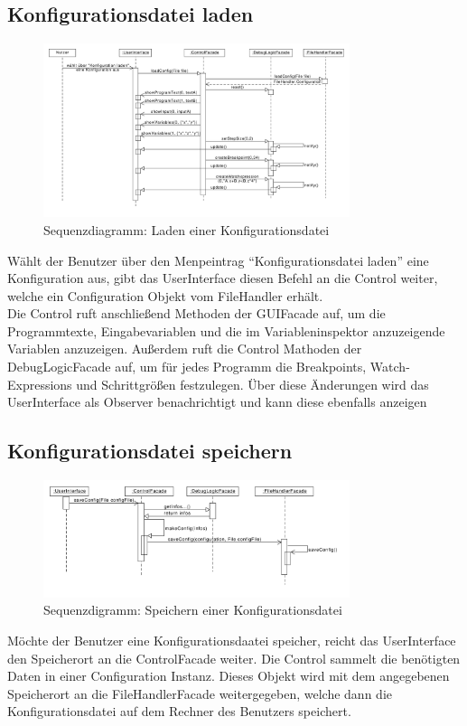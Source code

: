 \documentclass[parskip=full]{scrartcl}
\begin{document}
\subsection{Konfigurationsdatei laden}
\begin{figure}[!h]
\centering
\includegraphics[width=0.8\textwidth]{diagrammIdeenUmlet/SequenceDiagrams/seq_loadConfigPDF.pdf}
\caption{Sequenzdiagramm:  Laden einer Konfigurationsdatei}
\end{figure}
Wählt der Benutzer über den Menpeintrag \enquote{Konfigurationsdatei laden} eine Konfiguration aus,
gibt das UserInterface diesen Befehl an die Control weiter, welche ein Configuration Objekt vom FileHandler 
erhält. \\
Die Control ruft anschließend Methoden der GUIFacade auf, um die Programmtexte, Eingabevariablen und
die im Variableninspektor anzuzeigende Variablen anzuzeigen. Außerdem ruft die Control
Mathoden der DebugLogicFacade auf, um für jedes Programm die Breakpoints, Watch-Expressions und
Schrittgrößen festzulegen. Über diese Änderungen wird das UserInterface als Observer benachrichtigt und
kann diese ebenfalls anzeigen

\newpage
\subsection{Konfigurationsdatei speichern}
\begin{figure}[!h]
\centering
\includegraphics[width=0.8\textwidth]{diagrammIdeenUmlet/SequenceDiagrams/seq_saveConfigPDF.pdf}
\caption{Sequenzdigramm: Speichern einer Konfigurationsdatei}
\end{figure}
Möchte der Benutzer eine Konfigurationsdaatei speicher, reicht das UserInterface den Speicherort
an die ControlFacade weiter. Die Control sammelt die benötigten Daten in einer Configuration Instanz.
Dieses Objekt wird mit dem angegebenen Speicherort an die FileHandlerFacade weitergegeben, welche 
dann die Konfigurationsdatei auf dem Rechner des Benutzers speichert.
\end{document}
